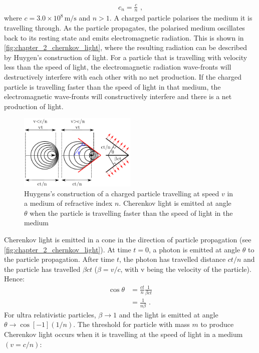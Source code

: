 \begin{equation}
    \begin{aligned}
    c_n = \frac{c}{n}\text{ ,}
    \end{aligned}
\end{equation}
\noindent where $c=3.0\times 10^8\,\si{\meter\per\second}$ and $n>1$.
\newpar 
A charged particle polarises the medium it is travelling through. As the particle propagates, the polarised medium oscillates back to its resting state and emits electromagnetic radiation. This is shown in \autoref{fig:chapter_2_chernkov_light}, where the resulting radiation can be described by Huygen's construction of light. For a particle that is travelling with velocity less than the speed of light, the electromagnetic radiation wave-fronts will destructively interfere with each other with no net production. If the charged particle is travelling faster than the speed of light in that medium, the electromagnetic wave-fronts will constructively interfere and there is a net production of light.
\newpar
\begin{figure}
    \includegraphics[width=0.5\textwidth]{05_Astronomy/Images/air_shower/chernkov_light.pdf}
    \caption{Huygens's construction of a charged particle travelling at speed $v$ in a medium of refractive index $n$. Cherenkov light is emitted at angle $\theta$ when the particle is travelling faster than the speed of light in the medium}
    \label{fig:chapter_2_chernkov_light}
\end{figure}
Cherenkov light is emitted in a cone in the direction of particle propagation (see \autoref{fig:chapter_2_chernkov_light}). At time $t=0$, a photon is emitted at angle $\theta$ to the particle propagation. After time $t$, the photon has travelled distance $ct/n$ and the particle has travelled $\beta ct$ ($\beta=v/c$, with v being the velocity of the particle). Hence:
\begin{equation}
    \begin{aligned}
    \cos\theta &= \frac{ct}{n} \frac{1}{\beta ct} \\
    &=\frac{1}{n\beta}\text{ .}
    \end{aligned}
\end{equation}
\noindent For ultra relativistic particles, $\beta\rightarrow 1$ and the light is emitted at angle $\theta \rightarrow \cos[-1](1/n)$.
\newpar
The threshold for particle with mass $m$ to produce Cherenkov light occurs when it is travelling at the speed of light in a medium $(v=c/n)$:

